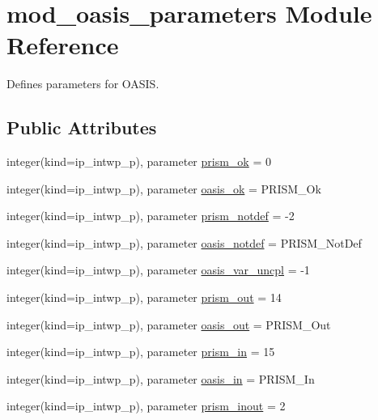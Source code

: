 \hypertarget{classmod__oasis__parameters}{\section{mod\+\_\+oasis\+\_\+parameters Module Reference}
\label{classmod__oasis__parameters}
}


Defines parameters for O\+A\+S\+I\+S.  


\subsection*{Public Attributes}
\begin{DoxyCompactItemize}
\item 
integer(kind=ip\+\_\+intwp\+\_\+p), parameter \hyperlink{classmod__oasis__parameters_aa7cbeb1a099f571702827ace878cdc64}{prism\+\_\+ok} = 0
\item 
integer(kind=ip\+\_\+intwp\+\_\+p), parameter \hyperlink{classmod__oasis__parameters_a3ea125963822918ce37fd3cfd9658c9f}{oasis\+\_\+ok} = P\+R\+I\+S\+M\+\_\+\+Ok
\item 
integer(kind=ip\+\_\+intwp\+\_\+p), parameter \hyperlink{classmod__oasis__parameters_aa388f517f0a947f770637d617bdda79b}{prism\+\_\+notdef} = -\/2
\item 
integer(kind=ip\+\_\+intwp\+\_\+p), parameter \hyperlink{classmod__oasis__parameters_acbe396fd3b5e7b00dd66425f0acb546d}{oasis\+\_\+notdef} = P\+R\+I\+S\+M\+\_\+\+Not\+Def
\item 
integer(kind=ip\+\_\+intwp\+\_\+p), parameter \hyperlink{classmod__oasis__parameters_ac906e1466e6cdc300a0b582af6619ca5}{oasis\+\_\+var\+\_\+uncpl} = -\/1
\item 
integer(kind=ip\+\_\+intwp\+\_\+p), parameter \hyperlink{classmod__oasis__parameters_a58d4e90d13e758e6a6dfab01e6a1415e}{prism\+\_\+out} = 14
\item 
integer(kind=ip\+\_\+intwp\+\_\+p), parameter \hyperlink{classmod__oasis__parameters_a76a150fa8ef6ed0b35183e627d757439}{oasis\+\_\+out} = P\+R\+I\+S\+M\+\_\+\+Out
\item 
integer(kind=ip\+\_\+intwp\+\_\+p), parameter \hyperlink{classmod__oasis__parameters_a9cd491b86da0ba4612f2de5a9ef52e7c}{prism\+\_\+in} = 15
\item 
integer(kind=ip\+\_\+intwp\+\_\+p), parameter \hyperlink{classmod__oasis__parameters_a16809ad581bb609aa5b0661927478653}{oasis\+\_\+in} = P\+R\+I\+S\+M\+\_\+\+In
\item 
integer(kind=ip\+\_\+intwp\+\_\+p), parameter \hyperlink{classmod__oasis__parameters_ae8105d0074bcd93e7da5c40331d2b9fe}{prism\+\_\+inout} = 2

\end{DoxyCompactItemize}
